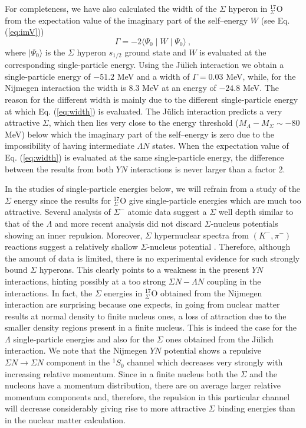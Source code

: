 For completeness, we have also calculated the width of the $\Sigma$
hyperon in $^{17}_\Sigma$O from the expectation value of the
imaginary part of the self--energy  $W$ (see Eq. (\ref{eq:imV}))
\begin{equation}
\Gamma= -2 \langle \Psi_0 \mid  W  \mid \Psi_0
\rangle \ , \label{eq:width}
\end{equation}
where $\mid \Psi_0 \rangle$ is the $\Sigma$ hyperon $s_{1/2}$ ground
state and $W$ is evaluated at the corresponding
single-particle energy.
Using the J\"ulich interaction we obtain a 
single-particle energy of $-51.2$ MeV and a
width of $\Gamma=0.03$ MeV, while, for the Nijmegen interaction the
width is $8.3$ MeV at an energy of $-24.8$ MeV. The reason for the
different width is mainly due to the different single-particle energy
at which Eq. (\ref{eq:width}) is evaluated. The
J\"ulich interaction predicts a very attractive $\Sigma$, which then lies
very close to the energy threshold ($M_\Lambda - M_\Sigma \sim -80$
MeV) below which the imaginary part
of the self--energy is zero due to the impossibility of having
intermediate $\Lambda N$ states.
When the expectation value of Eq. (\ref{eq:width}) is evaluated at the
same single-particle energy, the difference between the results
from both $YN$ interactions is never larger than a factor 2.


In the studies of single-particle energies below,
we will refrain from a study of the $\Sigma$ energy
since the results for $^{17}_{\Sigma}$O give single-particle 
energies which are much too
attractive. Several analysis of $\Sigma^{-}$ atomic data \cite{sig1,sig2}
suggest a $\Sigma$ well depth similar to that of the $\Lambda$
\cite{batty79,batty81} and more recent analysis \cite{batty94,mares95} did
not discard $\Sigma$-nucleus potentials showing an inner repulsion.
Moreover, $\Sigma$ hypernuclear spectra from $(K^-,\pi^-)$ reactions
suggest a relatively shallow $\Sigma$-nucleus potential \cite{dover89}.
Therefore, although the amount of data is limited, there is no 
experimental evidence
for such strongly bound $\Sigma$ hyperons. 
This clearly points to a weakness in the present $YN$ interactions,
hinting possibly at a too strong $\Sigma N - \Lambda N$ coupling
in the interactions. 
In fact, the $\Sigma$ energies in $^{17}_\Sigma$O obtained from the
Nijmegen interaction are surprising because one expects, in going from
nuclear matter results at normal density to finite nucleus ones, a
loss of attraction due to the smaller density regions present in a
finite nucleus. This is indeed the case for the $\Lambda$
single-particle energies and also for the $\Sigma$ ones obtained from
the J\"ulich interaction. We note that the Nijmegen $YN$ potential
shows a repulsive $\Sigma N \to \Sigma N$ component in the
$^1S_0$ channel which decreases very strongly with increasing relative
momentum. Since in a finite nucleus both
the $\Sigma$ and the nucleons have a momentum distribution, there are
on average larger relative momentum components and, therefore, the
repulsion in
this particular channel will decrease considerably 
giving rise to more attractive $\Sigma$
binding energies than in the nuclear matter calculation.




